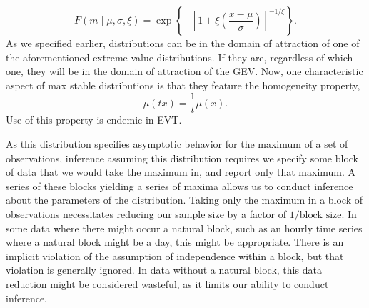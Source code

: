   \begin{equation*}
    \label{eqn:gev}
    F(m \mid \mu, \sigma, \xi) = \exp\left\lbrace-\left[1 + \xi\left(\frac{x - \mu}{\sigma}\right)\right]^{-1/{\xi}}\right\rbrace.
  \end{equation*}
  As we specified earlier, distributions can be in the domain of attraction of one of the
  aforementioned extreme value distributions.  If they are, regardless of which one, they will be in
  the domain of attraction of the GEV.  Now, one characteristic aspect of max stable distributions
  is that they feature the homogeneity property,
  \begin{equation*}
    \mu(tx) = \frac{1}{t}\mu(x).
  \end{equation*}
  Use of this property is endemic in EVT.

As this distribution specifies asymptotic behavior for the maximum of a set of observations,
  inference assuming this distribution requires we specify some block of data that we would take the
  maximum in, and report only that maximum.  A series of these blocks yielding a series of maxima
  allows us to conduct inference about the parameters of the distribution.  Taking only the maximum
  in a block of observations necessitates reducing our sample size by a factor of $1/\text{block size}$.
  In some data where there might occur a natural block, such as an hourly time series where a natural
  block might be a day, this might be appropriate.  There is an implicit violation of the assumption
  of independence within a block, but that violation is generally ignored.  In data without a natural
  block, this data reduction might be considered wasteful, as it limits our ability to conduct
  inference.


